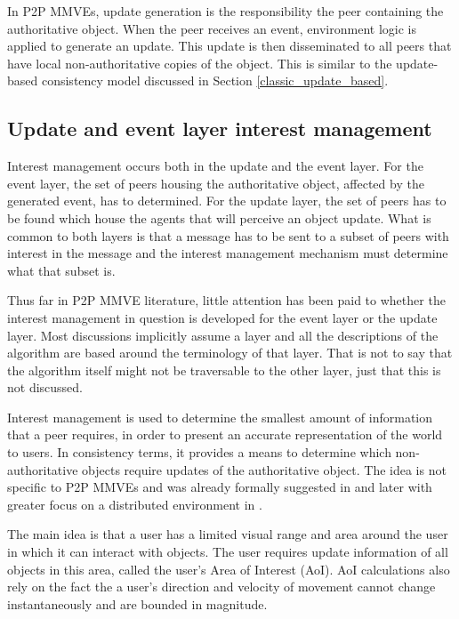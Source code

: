 In P2P MMVEs, update generation is the responsibility the peer containing the authoritative object. When the peer receives an event, environment logic is applied to generate an update. This update is then disseminated to all peers that have local non-authoritative copies of the object. This is similar to the update-based consistency model discussed in Section \ref{classic_update_based}.

\subsection{Update and event layer interest management}
\label{key_challenges_im}

Interest management occurs both in the update and the event layer. For the event layer, the set of peers housing the authoritative object, affected by the generated event, has to determined. For the update layer, the set of peers has to be found which house the agents that will perceive an object update. What is common to both layers is that a message has to be sent to a subset of peers with interest in the message and the interest management mechanism must determine what that subset is.

Thus far in P2P MMVE literature, little attention has been paid to whether the interest management in question is developed for the event layer or the update layer. Most discussions implicitly assume a layer and all the descriptions of the algorithm are based around the terminology of that layer. That is not to say that the algorithm itself might not be traversable to the other layer, just that this is not discussed.

Interest management is used to determine the smallest amount of information that a peer requires, in order to present an accurate representation of the world to users. In consistency terms, it provides a means to determine which non-authoritative objects require updates of the authoritative object. The idea is not specific to P2P MMVEs and was already formally suggested in \cite{First_IM} and later with greater focus on a distributed environment in \cite{Whang_agent_based_IM}.

The main idea is that a user has a limited visual range and area around the user in which it can interact with objects. The user requires update information of all objects in this area, called the user's Area of Interest (AoI). AoI calculations also rely on the fact the a user's direction and velocity of movement cannot change instantaneously and are bounded in magnitude.

